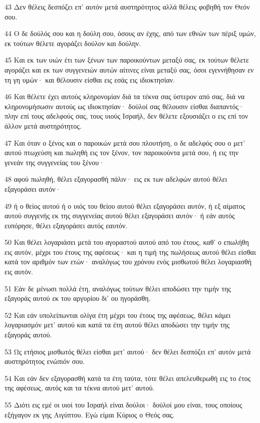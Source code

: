 \par 43 Δεν θέλεις δεσπόζει επ' αυτόν μετά αυστηρότητος αλλά θέλεις φοβηθή τον Θεόν σου.
\par 44 Ο δε δούλός σου και η δούλη σου, όσους αν έχης, από των εθνών των πέριξ υμών, εκ τούτων θέλετε αγοράζει δούλον και δούλην.
\par 45 Και εκ των υιών έτι των ξένων των παροικούντων μεταξύ σας, εκ τούτων θέλετε αγοράζει και εκ των συγγενειών αυτών αίτινες είναι μεταξύ σας, όσοι εγεννήθησαν εν τη γη υμών· και θέλουσιν είσθαι εις εσάς εις ιδιοκτησίαν.
\par 46 Και θέλετε έχει αυτούς κληρονομίαν διά τα τέκνα σας ύστερον από σας, διά να κληρονομήσωσιν αυτούς ως ιδιοκτησίαν· δούλοί σας θέλουσιν είσθαι διαπαντός· πλην επί τους αδελφούς σας, τους υιούς Ισραήλ, δεν θέλετε εξουσιάζει ο εις επί τον άλλον μετά αυστηρότητος.
\par 47 Και όταν ο ξένος και ο παροικών μετά σου πλουτήση, ο δε αδελφός σου ο μετ' αυτού πτωχεύση και πωληθή εις τον ξένον, τον παροικούντα μετά σου, ή εις την γενεάν της συγγενείας του ξένου·
\par 48 αφού πωληθή, θέλει εξαγορασθή πάλιν· εις εκ των αδελφών αυτού θέλει εξαγοράσει αυτόν·
\par 49 ή ο θείος αυτού ή ο υιός του θείου αυτού θέλει εξαγοράσει αυτόν, ή εξ αίματος αυτού συγγενής εκ της συγγενείας αυτού θέλει εξαγοράσει αυτόν· ή εάν αυτός ευπόρησε, θέλει εξαγοράσει αυτός εαυτόν.
\par 50 Και θέλει λογαριάσει μετά του αγοραστού αυτού από του έτους, καθ' ο επωλήθη εις αυτόν, μέχρι του έτους της αφέσεως· και η τιμή της πωλήσεως αυτού θέλει είσθαι κατά τον αριθμόν των ετών· αναλόγως του χρόνου ενός μισθωτού θέλει λογαριασθή εις αυτόν.
\par 51 Εάν δε μένωσι πολλά έτη, αναλόγως τούτων θέλει αποδώσει την τιμήν της εξαγοράς αυτού εκ του αργυρίου δι' ου ηγοράσθη.
\par 52 Και εάν υπολείπωνται ολίγα έτη μέχρι του έτους της αφέσεως, θέλει κάμει λογαριασμόν μετ' αυτού και κατά τα έτη αυτού θέλει αποδώσει την τιμήν της εξαγοράς αυτού.
\par 53 Ως ετήσιος μισθωτός θέλει είσθαι μετ' αυτού· δεν θέλει δεσπόζει επ' αυτόν μετά αυστηρότητος ενώπιόν σου.
\par 54 Και εάν δεν εξαγορασθή κατά τα έτη ταύτα, τότε θέλει απελευθερωθή εις το έτος της αφέσεως, αυτός και τα τέκνα αυτού μετ' αυτού.
\par 55 Διότι εις εμέ οι υιοί του Ισραήλ είναι δούλοι· δούλοί μου είναι, τους οποίους εξήγαγον εκ γης Αιγύπτου. Εγώ είμαι Κύριος ο Θεός σας.

